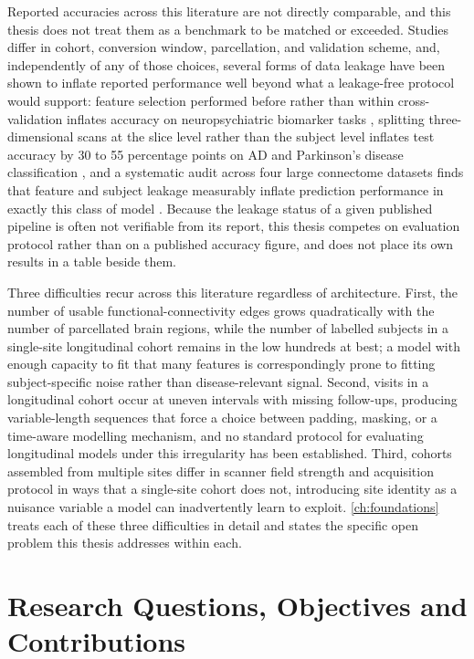 Reported accuracies across this literature are not directly comparable, and this thesis
does not treat them as a benchmark to be matched or exceeded. Studies differ in cohort,
conversion window, parcellation, and validation scheme, and, independently of any of
those choices, several forms of data leakage have been shown to inflate reported
performance well beyond what a leakage-free protocol would support: feature selection
performed before rather than within cross-validation inflates accuracy on neuropsychiatric
biomarker tasks \parencite{shim2021leakage}, splitting three-dimensional scans at the
slice level rather than the subject level inflates test accuracy by 30 to 55 percentage
points on \ac{AD} and Parkinson's disease classification \parencite{yagis2021leakage}, and
a systematic audit across four large connectome datasets finds that feature and subject
leakage measurably inflate prediction performance in exactly this class of model
\parencite{rosenblatt2024leakage}. Because the leakage status of a given published pipeline
is often not verifiable from its report, this thesis competes on evaluation protocol
rather than on a published accuracy figure, and does not place its own results in a table
beside them.

Three difficulties recur across this literature regardless of architecture. First, the
number of usable functional-connectivity edges grows quadratically with the number of
parcellated brain regions, while the number of labelled subjects in a single-site
longitudinal cohort remains in the low hundreds at best; a model with enough capacity to
fit that many features is correspondingly prone to fitting subject-specific noise rather
than disease-relevant signal. Second, visits in a longitudinal cohort occur at uneven
intervals with missing follow-ups, producing variable-length sequences that force a
choice between padding, masking, or a time-aware modelling mechanism, and no standard
protocol for evaluating longitudinal models under this irregularity has been established.
Third, cohorts assembled from multiple sites differ in scanner field strength and
acquisition protocol in ways that a single-site cohort does not, introducing site identity
as a nuisance variable a model can inadvertently learn to exploit. \autoref{ch:foundations}
treats each of these three difficulties in detail and states the specific open problem this
thesis addresses within each.

\section{Research Questions, Objectives and Contributions}\label{sec:research-questions}

